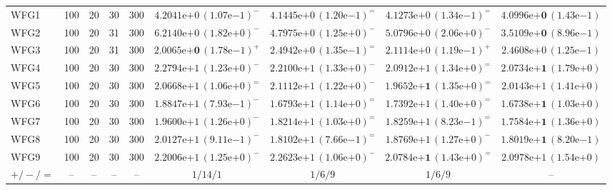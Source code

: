 \begin{table}[t]
{\begin{tabular}{lcccccccc}
\midrule
WFG1 & 100 & 20 & 30 & 300 & $4.2041\mathrm{e}{+0}\,(1.07\mathrm{e}{-1})^{-}$ & $4.1445\mathrm{e}{+0}\,(1.20\mathrm{e}{-1})^{=}$ & $4.1273\mathrm{e}{+0}\,(1.34\mathrm{e}{-1})^{=}$ & $\mathbf{4.0996\mathrm{e}{+0}}\,(1.43\mathrm{e}{-1})$ \\
WFG2 & 100 & 20 & 31 & 300 & $6.2140\mathrm{e}{+0}\,(1.82\mathrm{e}{+0})^{-}$ & $4.7975\mathrm{e}{+0}\,(1.25\mathrm{e}{+0})^{-}$ & $5.0796\mathrm{e}{+0}\,(2.06\mathrm{e}{+0})^{-}$ & $\mathbf{3.5109\mathrm{e}{+0}}\,(8.96\mathrm{e}{-1})$ \\
WFG3 & 100 & 20 & 31 & 300 & $\mathbf{2.0065\mathrm{e}{+0}}\,(1.78\mathrm{e}{-1})^{+}$ & $2.4942\mathrm{e}{+0}\,(1.35\mathrm{e}{-1})^{=}$ & $2.1114\mathrm{e}{+0}\,(1.19\mathrm{e}{-1})^{+}$ & $2.4608\mathrm{e}{+0}\,(1.25\mathrm{e}{-1})$ \\
WFG4 & 100 & 20 & 30 & 300 & $2.2794\mathrm{e}{+1}\,(1.23\mathrm{e}{+0})^{-}$ & $2.2100\mathrm{e}{+1}\,(1.33\mathrm{e}{+0})^{-}$ & $2.0912\mathrm{e}{+1}\,(1.34\mathrm{e}{+0})^{=}$ & $\mathbf{2.0734\mathrm{e}{+1}}\,(1.79\mathrm{e}{+0})$ \\
WFG5 & 100 & 20 & 30 & 300 & $2.0668\mathrm{e}{+1}\,(1.06\mathrm{e}{+0})^{=}$ & $2.1112\mathrm{e}{+1}\,(1.22\mathrm{e}{+0})^{-}$ & $\mathbf{1.9652\mathrm{e}{+1}}\,(1.35\mathrm{e}{+0})^{=}$ & $2.0143\mathrm{e}{+1}\,(1.41\mathrm{e}{+0})$ \\
WFG6 & 100 & 20 & 30 & 300 & $1.8847\mathrm{e}{+1}\,(7.93\mathrm{e}{-1})^{-}$ & $1.6793\mathrm{e}{+1}\,(1.14\mathrm{e}{+0})^{=}$ & $1.7392\mathrm{e}{+1}\,(1.40\mathrm{e}{+0})^{=}$ & $\mathbf{1.6738\mathrm{e}{+1}}\,(1.03\mathrm{e}{+0})$ \\
WFG7 & 100 & 20 & 30 & 300 & $1.9600\mathrm{e}{+1}\,(1.26\mathrm{e}{+0})^{-}$ & $1.8214\mathrm{e}{+1}\,(1.03\mathrm{e}{+0})^{=}$ & $1.8259\mathrm{e}{+1}\,(8.23\mathrm{e}{-1})^{=}$ & $\mathbf{1.7584\mathrm{e}{+1}}\,(1.36\mathrm{e}{+0})$ \\
WFG8 & 100 & 20 & 30 & 300 & $2.0127\mathrm{e}{+1}\,(9.11\mathrm{e}{-1})^{-}$ & $1.8102\mathrm{e}{+1}\,(7.66\mathrm{e}{-1})^{=}$ & $1.8769\mathrm{e}{+1}\,(1.27\mathrm{e}{+0})^{-}$ & $\mathbf{1.8019\mathrm{e}{+1}}\,(8.20\mathrm{e}{-1})$ \\
WFG9 & 100 & 20 & 30 & 300 & $2.2006\mathrm{e}{+1}\,(1.25\mathrm{e}{+0})^{-}$ & $2.2623\mathrm{e}{+1}\,(1.06\mathrm{e}{+0})^{-}$ & $\mathbf{2.0784\mathrm{e}{+1}}\,(1.43\mathrm{e}{+0})^{=}$ & $2.0978\mathrm{e}{+1}\,(1.54\mathrm{e}{+0})$ \\
\midrule
$+/-/=$ & -- & -- & -- & -- & $1/14/1$ & $1/6/9$ & $1/6/9$ & -- \\
\bottomrule
\end{tabular}%
}
\end{table}
